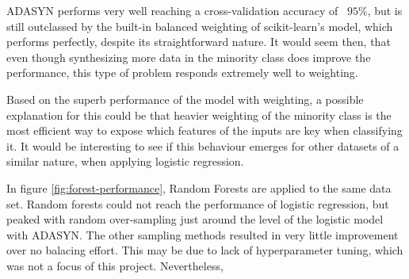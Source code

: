 ADASYN performs very well reaching a cross-validation
accuracy of ~$95\%$, but is still outclassed by the built-in balanced
weighting of scikit-learn's model, which performs perfectly, despite its
straightforward nature. It would seem then, that even though synthesizing 
more data in the minority class does improve the performance, 
this type of problem responds extremely well to weighting.

Based on the superb performance of the model with weighting, a possible 
explanation for this could be that heavier weighting of the minority
class is the most efficient way to expose which features of the inputs are
key when classifying it. It would be interesting to see if this behaviour
emerges for other datasets of a similar nature, when applying logistic
regression.

In figure \ref{fig:forest-performance}, Random Forests are applied to the
same data set. Random forests could not reach the performance of logistic
regression, but peaked with random over-sampling just around the level of the 
logistic model with ADASYN. The other sampling methods resulted in very little
improvement over no balacing effort. This may be due to lack of hyperparameter
tuning, which was not a focus of this project.
Nevertheless, 


